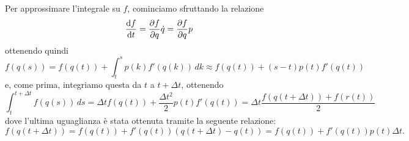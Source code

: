 \documentclass[10pt,a4paper]{article}
\begin{document}
Per approssimare l'integrale su \(f\), cominciamo sfruttando la relazione
\begin{equation}
	\dv{f}{t} = \pdv{f}{q} \dot{q} = \pdv{f}{q} p
\end{equation}
ottenendo quindi
\begin{equation}
	f(q(s)) = f(q(t))+\int_t^s p(k)f'(q(k))\,dk \approx f(q(t))+(s-t)p(t)f'(q(t))
\end{equation}
e, come prima, integriamo questa da \(t\) a \(t+\Delta t\), ottenendo
\begin{equation}
	\int_t^{t+\Delta t} f(q(s))\,ds = \Delta t f(q(t)) + \frac{\Delta t^2}{2}p(t)f'(q(t)) = \Delta t \frac{f(q(t+\Delta t))+ f(r(t))}{2}
\end{equation}
dove l'ultima uguaglianza è stata ottenuta tramite la seguente relazione:
\begin{equation}
	f(q(t+\Delta t)) = f(q(t)) + f'(q(t))(q(t+\Delta t)-q(t)) = f(q(t)) + f'(q(t))p(t)\Delta t.
\end{equation}
\end{document}
